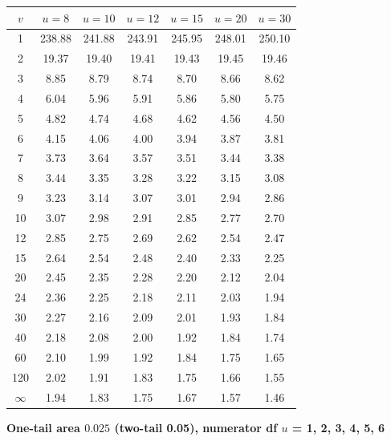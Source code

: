 \begin{center}
\small
\begin{tabular}{c|cccccc}
\toprule
$v$ & $u=8$ & $u=10$ & $u=12$ & $u=15$ & $u=20$ & $u=30$ \\
\midrule
1 & 238.88 & 241.88 & 243.91 & 245.95 & 248.01 & 250.10 \\
2 & 19.37 & 19.40 & 19.41 & 19.43 & 19.45 & 19.46 \\
3 & 8.85 & 8.79 & 8.74 & 8.70 & 8.66 & 8.62 \\
4 & 6.04 & 5.96 & 5.91 & 5.86 & 5.80 & 5.75 \\
5 & 4.82 & 4.74 & 4.68 & 4.62 & 4.56 & 4.50 \\
6 & 4.15 & 4.06 & 4.00 & 3.94 & 3.87 & 3.81 \\
7 & 3.73 & 3.64 & 3.57 & 3.51 & 3.44 & 3.38 \\
8 & 3.44 & 3.35 & 3.28 & 3.22 & 3.15 & 3.08 \\
9 & 3.23 & 3.14 & 3.07 & 3.01 & 2.94 & 2.86 \\
10 & 3.07 & 2.98 & 2.91 & 2.85 & 2.77 & 2.70 \\
12 & 2.85 & 2.75 & 2.69 & 2.62 & 2.54 & 2.47 \\
15 & 2.64 & 2.54 & 2.48 & 2.40 & 2.33 & 2.25 \\
20 & 2.45 & 2.35 & 2.28 & 2.20 & 2.12 & 2.04 \\
24 & 2.36 & 2.25 & 2.18 & 2.11 & 2.03 & 1.94 \\
30 & 2.27 & 2.16 & 2.09 & 2.01 & 1.93 & 1.84 \\
40 & 2.18 & 2.08 & 2.00 & 1.92 & 1.84 & 1.74 \\
60 & 2.10 & 1.99 & 1.92 & 1.84 & 1.75 & 1.65 \\
120 & 2.02 & 1.91 & 1.83 & 1.75 & 1.66 & 1.55 \\
$\infty$ & 1.94 & 1.83 & 1.75 & 1.67 & 1.57 & 1.46 \\
\bottomrule
\end{tabular}
\end{center}

\textbf{One-tail area $0.025$ (two-tail 0.05), numerator df $u$ = 1, 2, 3, 4, 5, 6}

